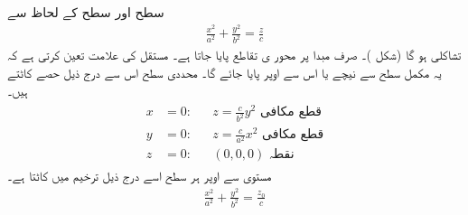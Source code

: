 سطح  اور سطح  کے لحاظ سے 
\begin{align}\label{مساوات_ترخیمی_قطع_مکافی_سطح}
\frac{x^2}{a^2}+\frac{y^2}{b^2}=\frac{z}{c}
\end{align}
تشاکلی ہو گا (شکل )۔ صرف مبدا پر محور ی  تقاطع پایا جاتا ہے۔ مستقل   کی علامت  تعین کرتی ہے کہ یہ  مکمل  سطح  سے نیچے یا اس سے اوپر پایا جائے گا۔ محددی سطح اس سے درج ذیل حصے کاٹتے ہیں۔
\begin{gather}
\begin{aligned}
x&=0:&& z=\frac{c}{b^2}y^2\,\,\text{قطع مکافی}\\
y&=0:&&z=\frac{c}{a^2}x^2\,\,\text{قطع مکافی}\\
z&=0:&&(0,0,0)\,\,\text{نقطہ}
\end{aligned}
\end{gather}
مستوی  سے اوپر ہر سطح   اسے  درج ذیل ترخیم میں کاٹتا ہے۔
\begin{align*}
\frac{x^2}{a^2}+\frac{y^2}{b^2}=\frac{z_0}{c}
\end{align*}
